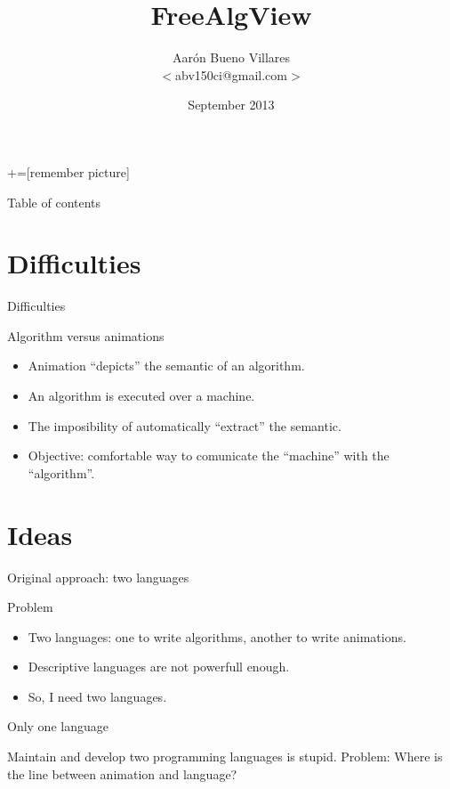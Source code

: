 \documentclass[12pt,xcolor=svgnames]{beamer}
\title[FreeAlgView]{FreeAlgView}
\author[Aarón Bueno]{Aarón Bueno Villares\\$<$abv150ci@gmail.com$>$}
\institute[UCA \& FHWS]{\textit{Universidad de Cádiz} \\ \textit{Hochschule für
    angewandte Wissenchaften Würzburg-Scheweinfurt}}
\date{September 2013}
\begin{document}
+=[remember picture]
\everymath{\displaystyle}

\begin{frame}
  \titlepage
\end{frame}

\begin{frame}{Table of contents}
  \transdissolve
  \tableofcontents
\end{frame}

\section{Difficulties}

\begin{frame}{Difficulties}
  \begin{block}{Algorithm versus animations}
    \begin{itemize}
    \item Animation ``depicts'' the semantic of an algorithm.
    \item An algorithm is executed over a machine.
    \item The imposibility of automatically ``extract'' the semantic.
    \item Objective: comfortable way to comunicate the ``machine'' with the
      ``algorithm''.
    \end{itemize}
  \end{block}
\end{frame}

\section{Ideas}

\begin{frame}{Original approach: two languages}
  \begin{block}{Problem}
    \begin{itemize}
    \item Two languages: one to write algorithms, another to write animations.
    \item Descriptive languages are not powerfull enough.
    \item So, I need two languages.
    \end{itemize}
  \end{block}

  \pause

  \begin{block}{Only one language}
      \begin{center}
        Maintain and develop two programming languages is stupid.
        Problem: Where is the line between animation and language?
      \end{center}
  \end{block}
\end{frame}
\end{document}
